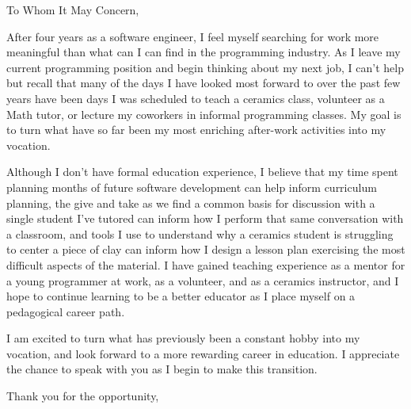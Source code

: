 
\signature{Walter Askew\\
1220 N Washtenaw Apt 3R\\
Chicago, IL 60622}

\begin{letter}{}

\opening{To Whom It May Concern,}

After four years as a software engineer, I feel myself searching
for work more meaningful than what can I can find in the programming
industry.
As I leave my current programming position and begin thinking
about my next job, I can't help but recall that many of the
days I have looked most forward to over the past few years have been
days I was scheduled to teach a ceramics class, volunteer as a
Math tutor, or lecture my coworkers in informal programming classes.
My goal is to turn what have so far been my most enriching after-work
activities into my vocation.

Although I don't have formal education experience, I believe that my
time spent planning months of future software development can help
inform curriculum planning, the give and take as we find a common
basis for discussion with a single student I've tutored can inform how
I perform that same conversation with a classroom, and tools I use to
understand why a ceramics student is struggling to center a piece of
clay can inform how I design a lesson plan exercising the most
difficult aspects of the material.
I have gained teaching experience as a mentor for a young programmer
at work, as a volunteer, and as a ceramics instructor, and I hope to
continue learning to be a better educator as I place myself on a
pedagogical career path.

I am excited to turn what has previously been a constant hobby into my
vocation, and look forward to a more rewarding career in education.
I appreciate the chance to speak with you as I begin to make this
transition.

\closing{Thank you for the opportunity,}
\end{letter}

